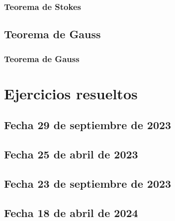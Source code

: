 \documentclass{report}
\begin{document}
        \subsection{Teorema de Stokes}
            
        \section{Teorema de Gauss}
        \subsection{Teorema de Gauss}
            








    \chapter{Ejercicios resueltos}
        \section{Fecha 29 de septiembre de 2023}
            

    
    
        \newpage
        \section{Fecha 25 de abril de 2023}
            





            \newpage
        \section{Fecha 23 de septiembre de 2023}
            


            \newpage
        \section{Fecha 18 de abril de 2024}
            
            


        \newpage
\end{document}
